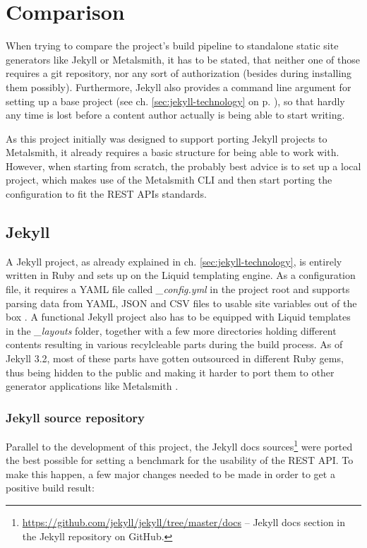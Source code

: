\section{Comparison}
\label{sec:comparison}

When trying to compare the project's build pipeline to standalone static site generators like Jekyll or Metalsmith, it has to be stated, that neither one of those requires a git repository, nor any sort of authorization (besides during installing them possibly). Furthermore, Jekyll also provides a command line argument for setting up a base project (see ch. \ref{sec:jekyll-technology} on p. \pageref{sec:jekyll-technology}), so that hardly any time is lost before a content author actually is being able to start writing.

As this project initially was designed to support porting Jekyll projects to Metalsmith, it already requires a basic structure for being able to work with. However, when starting from scratch, the probably best advice is to set up a local project, which makes use of the Metalsmith CLI and then start porting the configuration to fit the REST APIs standards.

\subsection{Jekyll}
A Jekyll project, as already explained in ch. \ref{sec:jekyll-technology}, is entirely written in Ruby and sets up on the Liquid templating engine. As a configuration file, it requires a YAML file called \emph{\_config.yml} in the project root and supports parsing data from YAML, JSON and CSV files to usable site variables out of the box \cite[76]{dhillon2016}. A functional Jekyll project also has to be equipped with Liquid templates in the \emph{\_layouts} folder, together with a few more directories holding different contents resulting in various recylcleable parts during the build process. As of Jekyll 3.2, most of these parts have gotten outsourced in different Ruby gems, thus being hidden to the public and making it harder to port them to other generator applications like Metalsmith \cite{JekyllDirectoryStructure}.

\subsubsection{Jekyll source repository}
Parallel to the development of this project, the Jekyll docs sources\footnote{\url{https://github.com/jekyll/jekyll/tree/master/docs} -- Jekyll docs section in the Jekyll repository on GitHub.} were ported the best possible for setting a benchmark for the usability of the REST API. To make this happen, a few major changes needed to be made in order to get a positive build result:

